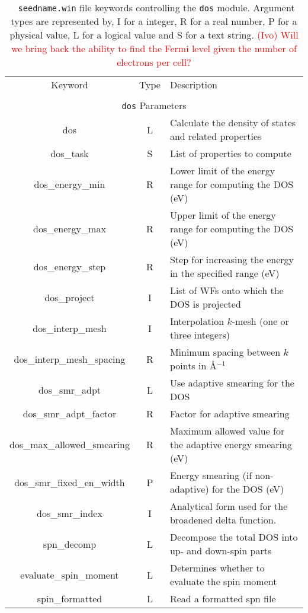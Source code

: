 \begin{table}[hH!]
\begin{center}
\begin{tabular}{|c|c|p{6cm}|}
  \hline
  Keyword & Type & Description \\
  &      &             \\
  \hline\hline
  \multicolumn{3}{|c|}{{\tt dos} Parameters} \\
  \hline
  {\sc dos}  & L & Calculate the density of states and related properties\\
  {\sc dos\_task}& S  & List of properties to compute \\
  {\sc dos\_energy\_min} & R & Lower limit of the energy range for
  computing the DOS (eV)\\
  {\sc dos\_energy\_max}& R & Upper limit of the energy range for
  computing the DOS (eV)\\
  {\sc dos\_energy\_step}& R & Step for increasing the energy in the specified range (eV)\\
  {\sc dos\_project}& I & List of WFs onto which the DOS is projected\\
  {\sc dos\_interp\_mesh} & I & Interpolation $k$-mesh (one or three integers)\\ 
  {\sc dos\_interp\_mesh\_spacing}& R & Minimum spacing between $k$ points in \AA$^{-1}$\\
  {\sc dos\_smr\_adpt} & L & Use adaptive smearing for the DOS \\
  {\sc dos\_smr\_adpt\_factor} & R & Factor for adaptive smearing \\
  {\sc dos\_max\_allowed\_smearing} & R & Maximum allowed value for the adaptive energy smearing (eV) \\
  {\sc dos\_smr\_fixed\_en\_width} & P  & Energy smearing (if non-adaptive) for the DOS (eV) \\   
{\sc dos\_smr\_index} & I & Analytical form used for the broadened delta function. \\
  {\sc spn\_decomp}& L & Decompose the total DOS into
  up- and down-spin parts\\
  {\sc evaluate\_spin\_moment}& L & Determines whether to evaluate the spin moment\\
  {\sc spin\_formatted}& L & Read a formatted spn file\\
  \hline
\end{tabular}
\caption[Parameter file keywords controlling the DOS module.]  {{\tt
    seedname.win} file keywords controlling the {\tt dos}
  module. Argument types are represented by, I for a integer, R for a
  real number, P for a physical value, L for a logical value and S for
  a text string.  \textcolor{red}{(Ivo) Will we bring back the ability
    to find the Fermi level given the number of electrons per cell?}
}
\label{parameter_keywords_dos}
\end{center}
\end{table}



